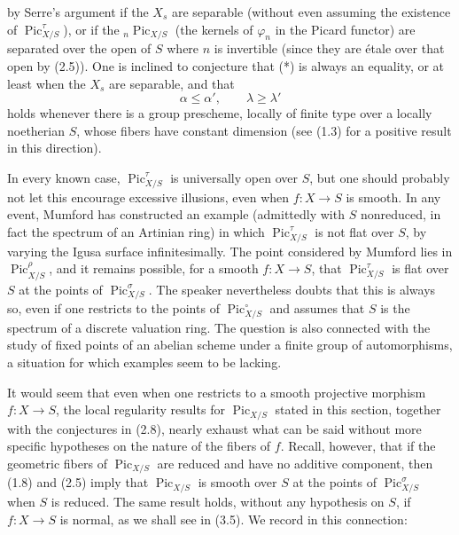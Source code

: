 by Serre's argument if the $X_s$ are separable (without even assuming the
existence of $\operatorname{Pic}_{X/S}^\tau$), or if the
${}_n\operatorname{Pic}_{X/S}$ (the kernels of $\varphi_n$ in the Picard
functor) are separated over the open of $S$ where $n$ is invertible (since
they are étale over that open by (2.5)). One
is inclined to conjecture that (*) is always an equality, or at least when the
$X_s$ are separable, and that
\[
\tag{***}\alpha\leq\alpha',\qquad\lambda\geq\lambda'
\]
holds whenever there is a group prescheme, locally of finite type over a
locally noetherian $S$, whose fibers have constant dimension (see (1.3) for a
positive result in this direction).

 In every known case,
$\operatorname{Pic}_{X/S}^\tau$ is universally open over $S$, but one should
probably not let this encourage excessive illusions, even when
$f:X\longrightarrow S$ is smooth. In any event, Mumford has constructed an
example (admittedly with $S$ nonreduced, in fact the spectrum of an Artinian
ring) in which $\operatorname{Pic}_{X/S}^\tau$ is not flat over $S$, by varying
the Igusa surface infinitesimally. The point considered by Mumford lies in
$\operatorname{Pic}_{X/S}^\rho$, and it remains possible, for a smooth
$f:X\longrightarrow S$, that $\operatorname{Pic}_{X/S}^\tau$ is flat over $S$
at the points of $\operatorname{Pic}_{X/S}^\sigma$. The speaker nevertheless
doubts that this is always so, even if one restricts to the points of
$\operatorname{Pic}_{X/S}^\circ$ and assumes that $S$ is the spectrum of a
discrete valuation ring. The question is also connected with the study of
fixed points of an abelian scheme under a finite group of automorphisms, a
situation for which examples seem to be lacking.

It would seem that even when one restricts to a smooth projective morphism
$f:X\longrightarrow S$, the local regularity results for
$\operatorname{Pic}_{X/S}$ stated in this section, together with the
conjectures in (2.8), nearly exhaust what can be said without more specific
hypotheses on the nature of the fibers of $f$. Recall, however, that if the
geometric fibers of $\operatorname{Pic}_{X/S}$ are reduced and have no
additive component, then (1.8) and (2.5) imply that
$\operatorname{Pic}_{X/S}$ is smooth over $S$ at the points of
$\operatorname{Pic}_{X/S}^\sigma$ when $S$ is reduced. The same result holds,
without any hypothesis on $S$, if $f:X\longrightarrow S$ is normal, as we
shall see in (3.5). We record in this connection:

